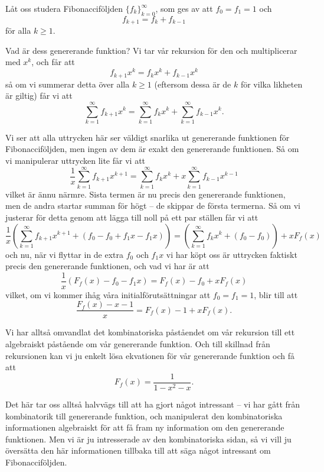 \documentclass[nobib]{tufte-handout}
\begin{document}
\begin{example}
    Låt oss studera Fibonacciföljden $\{f_k\}_{k=0}^\infty$, som ges av att $f_0 = f_1 = 1$ och
    $$f_{k+1} = f_k + f_{k-1}$$
    för alla $k \geq 1$.

    Vad är dess genererande funktion? Vi tar vår rekursion för den och multiplicerar med $x^k$, och får att
    $$f_{k+1} x^k = f_k x^k + f_{k-1} x^k$$
    så om vi summerar detta över alla $k \geq 1$ (eftersom dessa är de $k$ för vilka likheten är giltig) får vi att
    $$\sum_{k=1}^{\infty} f_{k+1}x^k = \sum_{k=1}^{\infty} f_k x^k + \sum_{k=1}^{\infty} f_{k-1}x^k.$$

    Vi ser att alla uttrycken här ser väldigt snarlika ut genererande funktionen för Fibonacciföljden, men ingen av dem är exakt den genererande funktionen. Så om vi manipulerar uttrycken lite får vi att
    $$\frac{1}{x}\sum_{k=1}^{\infty} f_{k+1}x^{k+1} = \sum_{k=1}^{\infty} f_k x^k + x\sum_{k=1}^{\infty} f_{k-1}x^{k-1}$$
    vilket är ännu närmre. Sista termen är nu precis den genererande funktionen, men de andra startar summan för högt -- de skippar de första termerna. Så om vi justerar för detta genom att lägga till noll på ett par ställen får vi att
    $$\frac{1}{x}\left(\sum_{k=1}^{\infty} f_{k+1}x^{k+1} + (f_0 - f_0 + f_1x - f_1x)\right) = \left(\sum_{k=1}^{\infty} f_k x^k + (f_0 - f_0)\right) + xF_f(x)$$
    och nu, när vi flyttar in de extra $f_0$ och $f_1x$ vi har köpt oss är uttrycken faktiskt precis den genererande funktionen, och vad vi har är att
    $$\frac{1}{x}\left(F_f(x) - f_0 - f_1x\right) = F_f(x) - f_0 + xF_f(x)$$
    vilket, om vi kommer ihåg våra initialförutsättningar att $f_0 = f_1 = 1$, blir till att
    $$\frac{F_f(x) - x - 1}{x} = F_f(x) - 1 + xF_f(x).$$

    Vi har alltså omvandlat det kombinatoriska påståendet om vår rekursion till ett algebraiskt påstående om vår genererande funktion. Och till skillnad från rekursionen kan vi ju enkelt lösa ekvationen för vår genererande funktion och få att
    $$F_f(x) = \frac{1}{1 - x^2 - x}.$$
\end{example}

Det här tar oss alltså halvvägs till att ha gjort något intressant -- vi har gått från kombinatorik till genererande funktion, och manipulerat den kombinatoriska informationen algebraiskt för att få fram ny information om den genererande funktionen. Men vi är ju intresserade av den kombinatoriska sidan, så vi vill ju översätta den här informationen tillbaka till att säga något intressant om Fibonacciföljden.
\end{document}

